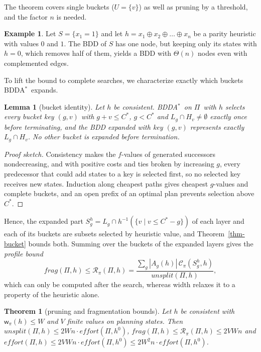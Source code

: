 \documentclass[letterpaper]{article}
\newcommand{\task}{\ensuremath{\Pi}}
\newcommand{\hblind}{\ensuremath{h^{0}}}
\newcommand{\copt}{\ensuremath{C^{*}}}
\newcommand{\width}{\ensuremath{\mathsf{w}}}
\newcommand{\cutprod}[2]{\ensuremath{\mathcal{C}_{\pi}(#1,#2)}}
\newcommand{\values}{\ensuremath{V}}
\newcommand{\level}[2]{\ensuremath{H_{#2}}}
\newcommand{\effort}{\ensuremath{\mathit{effort}}}
\newcommand{\unioneffort}{\ensuremath{\mathit{unsplit}}}
\newcommand{\fragfactor}{\ensuremath{\mathit{frag}}}
\newcommand{\profilescore}{\ensuremath{\mathcal{R}_{\pi}}}
\newcommand{\bddastar}{BDDA\ensuremath{^{*}}}
\theoremstyle{plain}
\newtheorem{theorem}{Theorem}
\newtheorem{lemma}{Lemma}
\theoremstyle{definition}
\newtheorem{example}{Example}
\theoremstyle{remark}
\begin{document}
The theorem covers single buckets ($U=\{v\}$) as well as pruning by a threshold, and the factor $n$ is needed.

\begin{example}
\label{ex-parity}
Let $S=\{x_1=1\}$ and let $h=x_1\oplus x_2\oplus\dots\oplus x_n$ be a parity heuristic with values $0$ and $1$.
The BDD of $S$ has one node, but keeping only its states with $h=0$, which removes half of them, yields a BDD with $\Theta(n)$ nodes even with complemented edges.
\end{example}

To lift the bound to complete searches, we characterize exactly which buckets \bddastar\ expands.

\begin{lemma}[bucket identity]
\label{lem-identity}
Let $h$ be consistent.
\bddastar\ on \task\ with $h$ selects every bucket key $(g,v)$ with $g + v \leq \copt$, $g < \copt$ and $L_g \cap \level{h}{v} \neq \emptyset$ exactly once before terminating, and the BDD expanded with key $(g,v)$ represents exactly $L_g \cap \level{h}{v}$.
No other bucket is expanded before termination.
\end{lemma}

\begin{proof}[Proof sketch]
Consistency makes the $f$-values of generated successors nondecreasing, and with positive costs and ties broken by increasing $g$, every predecessor that could add states to a key is selected first, so no selected key receives new states.
Induction along cheapest paths gives cheapest $g$-values and complete buckets, and an open prefix of an optimal plan prevents selection above \copt.
\end{proof}

Hence, the expanded part $S_g^h=L_g\cap h^{-1}(\{v\mid v\leq\copt-g\})$ of each layer and each of its buckets are subsets selected by heuristic value, and Theorem~\ref{thm-bucket} bounds both.
Summing over the buckets of the expanded layers gives the \emph{profile bound}
\[
 \fragfactor(\task,h)\leq\profilescore(\task,h)=
 \frac{\sum_g|A_g(h)|\,\cutprod{S_g^h}{h}}{\unioneffort(\task,h)},
\]
which can only be computed after the search, whereas width relaxes it to a property of the heuristic alone.

\begin{theorem}[pruning and fragmentation bounds]
\label{thm-effort}
Let $h$ be consistent with $\width_\pi(h)\leq W$ and $\values$ finite values on planning states.
Then $\unioneffort(\task,h)\leq2Wn\cdot\effort(\task,\hblind)$, $\fragfactor(\task,h)\leq\profilescore(\task,h)\leq2\values Wn$ and $\effort(\task,h)\leq2\values Wn\cdot\effort(\task,\hblind)\leq2W^2n\cdot\effort(\task,\hblind)$.
\end{theorem}
\end{document}
